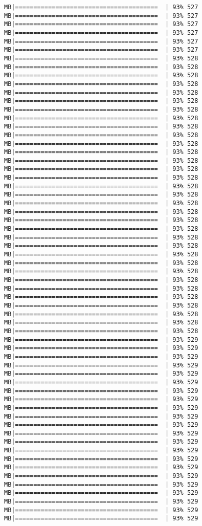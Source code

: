 \documentclass[
]{article}
\begin{document}
\begin{verbatim}
MB|=======================================  | 93% 527 MB|=======================================  | 93% 527 MB|=======================================  | 93% 527 MB|=======================================  | 93% 527 MB|=======================================  | 93% 527 MB|=======================================  | 93% 527 MB|=======================================  | 93% 528 MB|=======================================  | 93% 528 MB|=======================================  | 93% 528 MB|=======================================  | 93% 528 MB|=======================================  | 93% 528 MB|=======================================  | 93% 528 MB|=======================================  | 93% 528 MB|=======================================  | 93% 528 MB|=======================================  | 93% 528 MB|=======================================  | 93% 528 MB|=======================================  | 93% 528 MB|=======================================  | 93% 528 MB|=======================================  | 93% 528 MB|=======================================  | 93% 528 MB|=======================================  | 93% 528 MB|=======================================  | 93% 528 MB|=======================================  | 93% 528 MB|=======================================  | 93% 528 MB|=======================================  | 93% 528 MB|=======================================  | 93% 528 MB|=======================================  | 93% 528 MB|=======================================  | 93% 528 MB|=======================================  | 93% 528 MB|=======================================  | 93% 528 MB|=======================================  | 93% 528 MB|=======================================  | 93% 528 MB|=======================================  | 93% 528 MB|=======================================  | 93% 528 MB|=======================================  | 93% 528 MB|=======================================  | 93% 528 MB|=======================================  | 93% 528 MB|=======================================  | 93% 528 MB|=======================================  | 93% 528 MB|=======================================  | 93% 529 MB|=======================================  | 93% 529 MB|=======================================  | 93% 529 MB|=======================================  | 93% 529 MB|=======================================  | 93% 529 MB|=======================================  | 93% 529 MB|=======================================  | 93% 529 MB|=======================================  | 93% 529 MB|=======================================  | 93% 529 MB|=======================================  | 93% 529 MB|=======================================  | 93% 529 MB|=======================================  | 93% 529 MB|=======================================  | 93% 529 MB|=======================================  | 93% 529 MB|=======================================  | 93% 529 MB|=======================================  | 93% 529 MB|=======================================  | 93% 529 MB|=======================================  | 93% 529 MB|=======================================  | 93% 529 MB|=======================================  | 93% 529 MB|=======================================  | 93% 529 MB|=======================================  | 93% 529 
\end{verbatim}
\end{document}
